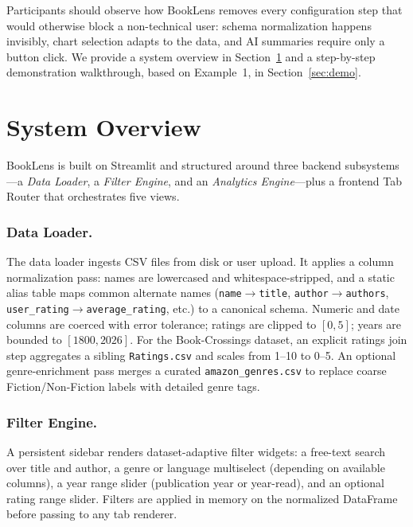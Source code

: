 \documentclass[sigconf]{acmart}
\begin{document}
Participants should observe how BookLens removes every configuration step that would otherwise block a non-technical user: schema normalization happens invisibly, chart selection adapts to the data, and AI summaries require only a button click. We provide a system overview in Section~\ref{sec:overview} and a step-by-step demonstration walkthrough, based on Example~1, in Section~\ref{sec:demo}.





\section{System Overview}
\label{sec:overview}

BookLens is built on Streamlit and structured around three backend subsystems---a \textit{Data Loader}, a \textit{Filter Engine}, and an \textit{Analytics Engine}---plus a frontend Tab Router that orchestrates five views.

\subsubsection*{Data Loader.} The data loader ingests CSV files from disk or user upload. It applies a column normalization pass: names are lowercased and whitespace-stripped, and a static alias table maps common alternate names (\texttt{name}$\to$\texttt{title}, \texttt{author}$\to$\texttt{authors}, \texttt{user\_rating}$\to$\texttt{average\_rating}, etc.) to a canonical schema. Numeric and date columns are coerced with error tolerance; ratings are clipped to $[0, 5]$; years are bounded to $[1800, 2026]$. For the Book-Crossings dataset, an explicit ratings join step aggregates a sibling \texttt{Ratings.csv} and scales from 1--10 to 0--5. An optional genre-enrichment pass merges a curated \texttt{amazon\_genres.csv} to replace coarse Fiction/Non-Fiction labels with detailed genre tags.

\subsubsection*{Filter Engine.} A persistent sidebar renders dataset-adaptive filter widgets: a free-text search over title and author, a genre or language multiselect (depending on available columns), a year range slider (publication year or year-read), and an optional rating range slider. Filters are applied in memory on the normalized DataFrame before passing to any tab renderer.
\end{document}
